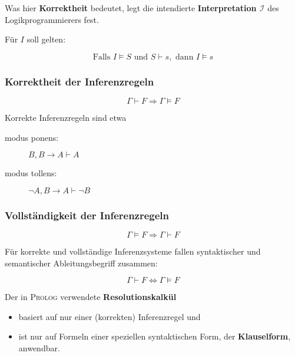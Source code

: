 \documentclass[runningheads,deutsch]{llncs}
\begin{document}
\parindent0mm
Was hier \textbf{Korrektheit} bedeutet, legt die intendierte \textbf{Interpretation  $\mathcal I$} des Logikprogrammierers fest.

\parindent5mm

Für $I$ soll gelten:

\[ \text{Falls } I \vDash S \text{ und } S \vdash s, \text{ dann } I \vDash s \]

\subsubsection{Korrektheit der Inferenzregeln}
\[ \Gamma \vdash F \Rightarrow \Gamma \vDash F \]

\parindent 0mm
Korrekte Inferenzregeln sind etwa
\begin{description}
    \item[modus ponens:] $B, B \rightarrow A \vdash A$
    \item[modus tollens:] $\lnot A, B \rightarrow A \vdash \lnot B$ 
\end{description}

\subsubsection{Vollständigkeit der Inferenzregeln}
\[ \Gamma \vDash F \Rightarrow \Gamma \vdash F \]

\parindent0mm
Für korrekte und vollständige Inferenzsysteme fallen syntaktischer und semantischer Ableitungsbegriff zusammen:

\[ \Gamma \vdash F \Leftrightarrow \Gamma \vDash F \]

Der in \textsc{Prolog} verwendete \textbf{Resolutionskalkül}
\begin{itemize}
    \item basiert auf nur einer (korrekten) Inferenzregel und
    \item ist nur auf Formeln einer speziellen syntaktischen Form, der \textbf{Klauselform}, anwendbar.
\end{itemize}
\end{document}

